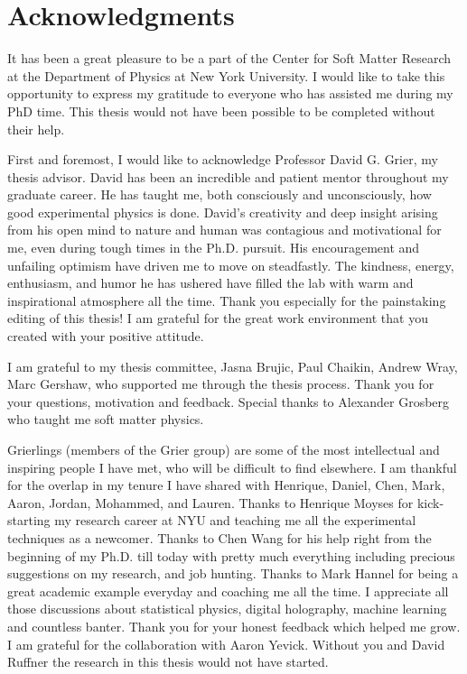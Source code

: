 \chapter*{Acknowledgments}
\label{ch:acknowledgments}


It has been a great pleasure to be a part of the Center for Soft Matter Research at the Department of Physics at New York University. I would like to take this opportunity to express my gratitude to everyone who has assisted me during my PhD time. This thesis would not have been possible to be completed without their help.

First and foremost, I would like to acknowledge Professor David G. Grier, my thesis advisor. David has been an incredible and patient mentor throughout my graduate career. He has taught me, both consciously and unconsciously, how good experimental physics is done. David's creativity and deep insight arising from his open mind to nature and human  was contagious and motivational for me, even during tough times in the Ph.D. pursuit. His encouragement and unfailing optimism have driven me to move on steadfastly. The kindness, energy, enthusiasm, and humor he has ushered have filled the lab with warm and inspirational atmosphere all the time.  Thank you especially for the painstaking editing of this thesis! I am grateful for the great work environment that you created with your positive attitude.

I am grateful to my thesis committee, Jasna Brujic, Paul Chaikin, Andrew Wray, Marc Gershaw, who supported me through the thesis process. Thank you for your questions, motivation and feedback. Special thanks to Alexander Grosberg who taught me soft matter physics.

Grierlings (members of the Grier group) are some of the most intellectual and inspiring people I have met, who will be difficult to find elsewhere. I am thankful for the overlap in my tenure I have shared with Henrique, Daniel, Chen, Mark, Aaron, Jordan, Mohammed, and Lauren. Thanks to Henrique Moyses for kick-starting my research career at NYU and teaching me all the experimental techniques as a newcomer. Thanks to Chen Wang for his help right from the beginning of my Ph.D. till today with pretty much everything including precious suggestions on my research, and job hunting. Thanks to Mark Hannel for being a great academic example everyday and coaching me all the time. I appreciate all those discussions about statistical physics, digital holography, machine learning and countless banter. Thank you for your honest feedback which helped me grow. I am grateful for the collaboration with Aaron Yevick. Without you and David Ruffner the research in this thesis would not have started.

